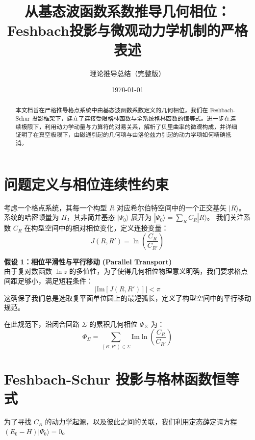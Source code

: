 \documentclass[a4paper,12pt]{article}
\title{\textbf{从基态波函数系数推导几何相位：\\Feshbach投影与微观动力学机制的严格表述}}
\author{理论推导总结（完整版）}
\date{\today}
\begin{document}
\maketitle

\begin{abstract}
本文档旨在严格推导格点系统中由基态波函数系数定义的几何相位。我们在 Feshbach-Schur 投影框架下，建立了连接受限格林函数与全系统格林函数的恒等式。进一步在连续极限下，利用动力学动量与力算符的对易关系，解析了贝里曲率的微观构成，并详细证明了在真空极限下，由磁通引起的几何项与由洛伦兹力引起的动力学项如何精确抵消。
\end{abstract}

\tableofcontents
\newpage

\section{问题定义与相位连续性约束}

考虑一个格点系统，其每一个构型 $R$ 对应希尔伯特空间中的一个正交基矢 $|R\rangle$。系统的哈密顿量为 $H$，其非简并基态 $|\Psi_0\rangle$ 展开为 $|\Psi_0\rangle = \sum_R C_R |R\rangle$。
我们关注系数 $C_R$ 在构型空间中的相对相位变化，定义连接变量：
\begin{equation}
    J(R, R') = \ln \left( \frac{C_R}{C_{R'}} \right)
\end{equation}

\begin{assumption}
\textbf{假设 1：相位平滑性与平行移动 (Parallel Transport)} \\
由于复对数函数 $\ln z$ 的多值性，为了使得几何相位物理意义明确，我们要求格点间距足够小，满足短程条件：
\begin{equation}
    |\text{Im}[J(R, R')]| < \pi
\end{equation}
这确保了我们总是选取复平面单位圆上的最短弧长，定义了构型空间中的平行移动规范。
\end{assumption}

在此规范下，沿闭合回路 $\Sigma$ 的累积几何相位 $\Phi_\Sigma$ 为：
\begin{equation}
    \Phi_\Sigma = \sum_{(R, R') \in \Sigma} \text{Im} \ln \left( \frac{C_R}{C_{R'}} \right)
\end{equation}

\section{Feshbach-Schur 投影与格林函数恒等式}

为了寻找 $C_R$ 的动力学起源，以及彼此之间的关联，我们利用定态薛定谔方程 $(E_0 - H) |\Psi_0\rangle = 0$。
\end{document}
